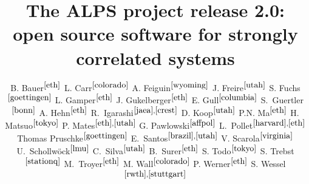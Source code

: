 \documentclass[12pt]{iopart}
\begin{document}
\title{The ALPS project release 2.0: \\ open source software for strongly correlated systems}


\newcommand{\myauthor}[3]{#2$^{#1}$}
\newcommand{\myaddress}[2]{\address{\refstepcounter{affiliation} $^{\arabic{affiliation}}$#2 \label{#1}}}

\author{
	\myauthor{\ref{eth}}{B. Bauer}{bauerb@phys.ethz.ch}
	\myauthor{\ref{colorado}}{L. Carr}{lcarr@mines.edu}
	\myauthor{\ref{wyoming}}{A. Feiguin}{afeiguin@uwyo.edu}
	\myauthor{\ref{utah}}{J. Freire}{juliana@cs.utah.edu}
	\myauthor{\ref{goettingen}}{S. Fuchs}{fuchs@theorie.physik.uni-goettingen.de}
	\myauthor{\ref{eth}}{L. Gamper}{gamperl@gmail.com}
	\myauthor{\ref{eth}}{J. Gukelberger}{gukelberger@phys.ethz.ch}
	\myauthor{\ref{columbia}}{E. Gull}{gull@phys.columbia.edu}
	\myauthor{\ref{bonn}}{S.~Guertler}{guertler@th.physik.uni-bonn.de}
	\myauthor{\ref{eth}}{A. Hehn}{hehn@phys.ethz.ch}
	\myauthor{\ref{jaea},\ref{crest}}{R.~Igarashi}{rigarash@hosi.phys.s.u-tokyo.ac.jp}
	\myauthor{\ref{utah}}{D. Koop}{dakoop@cs.utah.edu}
	\myauthor{\ref{eth}}{P.N. Ma}{pingnang@phys.ethz.ch}
	\myauthor{\ref{tokyo}}{H. Matsuo}{halm@looper.t.u-tokyo.ac.jp}
	\myauthor{\ref{eth},\ref{utah}}{P. Mates}{phillipmates@gmail.com}
	\myauthor{\ref{affpol}}{G. Pawlowski}{}
	\myauthor{\ref{harvard},\ref{eth}}{L.~Pollet}{pollet@phys.ethz.ch}
	\myauthor{\ref{goettingen}}{Thomas Pruschke}{pruschke@theorie.physik.uni-goettingen.de}
	\myauthor{\ref{brazil},\ref{utah}}{E.~Santos}{emanuele@sci.utah.edu}
	\myauthor{\ref{virginia}}{V. Scarola}{scarola@vt.edu}
	\myauthor{\ref{lmu}}{U.~Schollw\"ock}{schollwoeck@lmu.de}
	\myauthor{\ref{utah}}{C.~Silva}{csilva@sci.utah.edu}
	\myauthor{\ref{eth}}{B.~Surer}{surerb@phys.ethz.ch}
	\myauthor{\ref{tokyo}}{S. Todo}{wistaria@ap.t.u-tokyo.ac.jp}
	\myauthor{\ref{stationq}}{S. Trebst}{trebst@kitp.ucsb.edu}
	\myauthor{\ref{eth}}{M.~Troyer}{troyer@ethz.ch}
	\myauthor{\ref{colorado}}{M. Wall}{mwall@mymail.mines.edu}
	\myauthor{\ref{eth}}{P. Werner}{werner@phys.ethz.ch}
	\myauthor{\ref{rwth},\ref{stuttgart}}{S. Wessel}{wessel@phys.ethz.ch}
}
\end{document}
